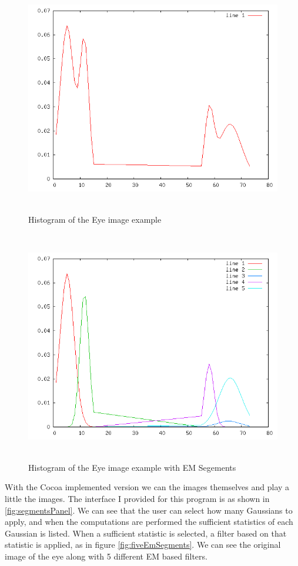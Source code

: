 \documentclass[]{article}
\begin{document}
\begin{figure}[htbp]
	\centering
		\includegraphics[height=4in]{probability-2.png}
	\caption{Histogram of the Eye image example}
	\label{fig:probability-2}
\end{figure}

\begin{figure}[htbp]
	\centering
		\includegraphics[height=4in]{probability.png}
	\caption{Histogram of the Eye image example with EM Segements}
	\label{fig:probability}
\end{figure}

With the Cocoa implemented version we can the images themselves and play a little the images.  The interface I provided for this program is as shown in \ref{fig:segmentsPanel}.  We can see that the user can select how many Gaussians to apply, and when the computations are performed the sufficient statistics of each Gaussian is listed.  When a sufficient statistic is selected, a filter based on that statistic is applied, as in figure \ref{fig:fiveEmSegments}.  We can see the original image of the eye along with 5 different EM based filters.
\end{document}

